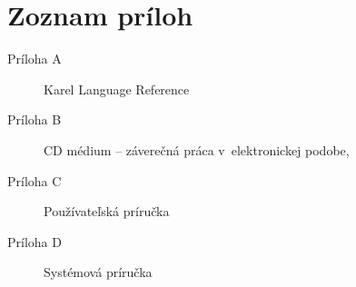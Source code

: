 
\chapter*{Zoznam príloh}

\begin{description}
	\item[Príloha A] Karel Language Reference
    \item[Príloha B] CD médium -- záverečná práca v~elektronickej podobe,
    \item[Príloha C] Používateľská príručka
    \item[Príloha D] Systémová príručka
\end{description}
